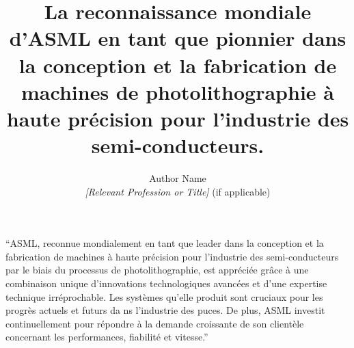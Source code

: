 \documentclass{article}
\title{La reconnaissance mondiale d'ASML en tant que pionnier dans la conception et la fabrication de machines de photolithographie à haute précision pour l'industrie des semi-conducteurs.}
\author{Author Name \\ \textit{[Relevant Profession or Title]} (if applicable)}
\begin{document}
``ASML, reconnue mondialement en tant que leader dans la conception et la fabrication de machines à haute précision pour l'industrie des semi-conducteurs par le biais du processus de photolithographie, est appréciée grâce à une combinaison unique d'innovations technologiques avancées et d'une expertise technique irréprochable. Les systèmes qu'elle produit sont cruciaux pour les progrès actuels et futurs da
ns l’industrie des puces. De plus, ASML investit continuellement pour répondre à la demande croissante de son clientèle concernant les performances, fiabilité et vitesse.''
\end{document}
